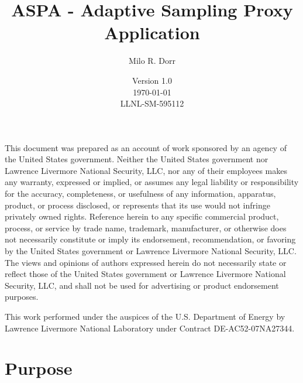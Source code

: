 \documentclass[12pt]{article}
\title{\bf ASPA - Adaptive Sampling Proxy Application}
\author{Milo R. Dorr}
\date{Version 1.0 \\ \today \\ \vspace{0.5em} LLNL-SM-595112}
\begin{document}
\maketitle

\newpage

\begin{center}
This document was prepared as an account of work sponsored by an agency of the United States government. Neither the United States government nor Lawrence Livermore National Security, LLC, nor any of their employees makes any warranty, expressed or implied, or assumes any legal liability or responsibility for the accuracy, completeness, or usefulness of any information, apparatus, product, or process disclosed, or represents that its use would not infringe privately owned rights. Reference herein to any specific commercial product, process, or service by trade name, trademark, manufacturer, or otherwise does not necessarily constitute or imply its endorsement, recommendation, or favoring by the United States government or Lawrence Livermore National Security, LLC. The views and opinions of authors expressed herein do not necessarily state or reflect those of the United States government or Lawrence Livermore National Security, LLC, and shall not be used for advertising or product endorsement purposes.

\vspace{1in}

This work performed under the auspices of the U.S. Department of
Energy by Lawrence Livermore National Laboratory under Contract
DE-AC52-07NA27344.

\end{center}

\newpage

\section{Purpose}
\end{document}
